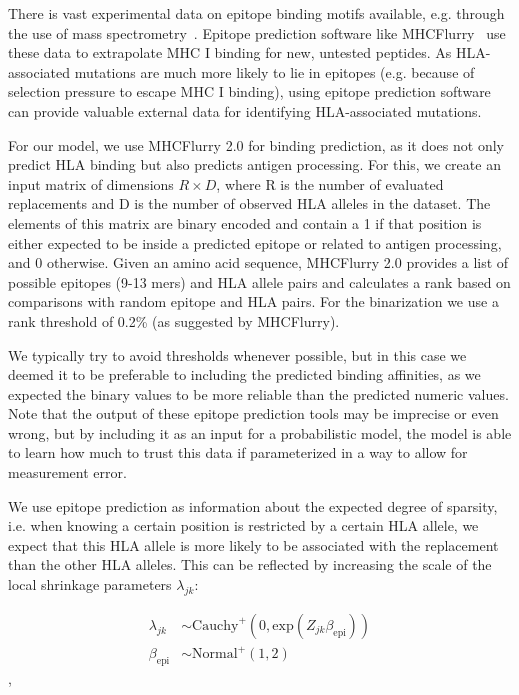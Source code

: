 \documentclass[fleqn,11pt]{SelfArx} %
\begin{document}
There is vast experimental data on epitope binding motifs available, e.g. through the use of mass spectrometry~\cite{Hunt1992}. Epitope prediction software like MHCFlurry~\cite{ODonnell2020} use these data to extrapolate MHC I binding for new, untested peptides.
As HLA-associated mutations are much more likely to lie in epitopes (e.g. because of selection pressure to escape MHC I binding), using epitope prediction software can provide valuable external data for identifying HLA-associated mutations.

For our model, we use MHCFlurry 2.0 for binding prediction, as it does not only predict HLA binding but also predicts antigen processing. For this, we create an input matrix of dimensions \(R\times D\), where R is the number of evaluated replacements and D is the number of observed HLA alleles in the dataset. The elements of this matrix are binary encoded and contain a 1 if that position is either expected to be inside a predicted epitope or related to antigen processing, and 0 otherwise. Given an amino acid sequence, MHCFlurry 2.0 provides a list of possible epitopes (9-13 mers) and HLA allele pairs and calculates a rank based on comparisons with random epitope and HLA pairs. For the binarization we use a rank threshold of 0.2\% (as suggested by MHCFlurry).

We typically try to avoid thresholds whenever possible, but in this case we deemed it to be preferable to including the predicted binding affinities, as we expected the binary values to be more reliable than the predicted numeric values.
Note that the output of these epitope prediction tools may be imprecise or even wrong, but by including it as an input for a probabilistic model, the model is able to learn how much to trust this data if parameterized in a way to allow for measurement error.

We use epitope prediction as information about the expected degree of sparsity, i.e. when knowing a certain position is restricted by a certain HLA allele, we expect that this HLA allele is more likely to be associated with the replacement than the other HLA alleles.
This can be reflected by increasing the scale of the local shrinkage parameters \(\lambda_{jk}\):

\begin{equation}
  \begin{aligned}
    \lambda_{jk} &\sim \text{Cauchy}^{+}(0, \text{exp}(Z_{jk}\beta_{\text{epi}})) \\
    \beta_{\text{epi}} &\sim \text{Normal}^{+}(1, 2)
  \end{aligned}
\end{equation},
 
\end{document}
